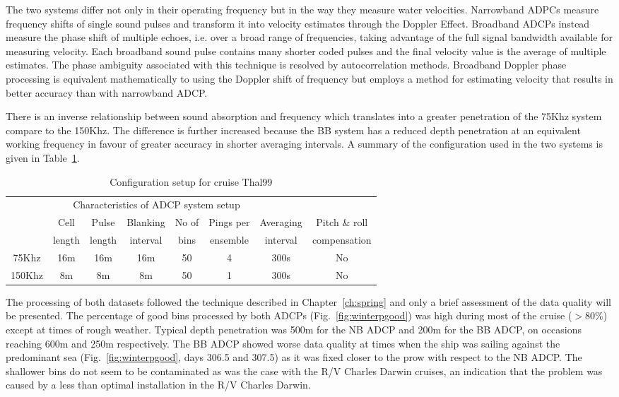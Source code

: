 The two systems differ not only in their operating frequency but
in the way they measure water velocities. Narrowband ADPCs measure
frequency shifts of single sound pulses and transform it into
velocity estimates through the Doppler Effect. Broadband ADCPs
instead measure the phase shift of multiple echoes, i.e. over a
broad range of frequencies, taking advantage of the full signal
bandwidth available for measuring velocity. Each broadband sound
pulse contains many shorter coded pulses and the final velocity
value is the average of multiple estimates. The phase ambiguity
associated with this technique is resolved by autocorrelation
methods. Broadband Doppler phase processing is equivalent
mathematically to using the Doppler shift of frequency but employs
a method for estimating velocity that results in better accuracy
than with narrowband ADCP.

There is an inverse relationship between sound absorption and
frequency which translates into a greater penetration of the 75Khz
system compare to the 150Khz. The difference is further increased
because the BB system has a reduced depth penetration at an
equivalent working frequency in favour of greater accuracy in
shorter averaging intervals. A summary of the configuration used
in the two systems is given in Table~\ref{tb:thaladcpcon}.

\begin{table}[ht]
  \centering
\begin{tabular}{cccccccc}
\hline \hline \multicolumn{7}{c}{Characteristics of ADCP system setup}\\
\cline{1-8}
 & Cell  & Pulse  & Blanking  & No of  &
Pings per  & Averaging  & Pitch \& roll  \\
 & length & length  &  interval &  bins &
 ensemble &  interval &  compensation \\
\cline{1-8}
75Khz&16m&16m&16m&50&4&300s&No\\
150Khz&8m&8m&8m&50&1&300s&No\\
\hline \hline
\end{tabular}
  \caption{Configuration setup for cruise Thal99}\label{tb:thaladcpcon}
\end{table}

The processing of both datasets followed the technique described
in Chapter~\ref{ch:spring} and only a brief assessment of the data
quality will be presented. The percentage of good bins processed
by both ADCPs (Fig.~\ref{fig:winterpgood}) was high during most of
the cruise ($>$80\%) except at times of rough weather. Typical
depth penetration was 500m for the NB ADCP and 200m for the BB
ADCP, on occasions reaching 600m and 250m respectively. The BB
ADCP showed worse data quality at times when the ship was sailing
against the predominant sea (Fig.~\ref{fig:winterpgood}, days
306.5 and 307.5) as it was fixed closer to the prow with respect
to the NB ADCP. The shallower bins do not seem to be contaminated
as was the case with the R/V Charles Darwin cruises, an indication
that the problem was caused by a less than optimal installation in
the R/V Charles Darwin.

